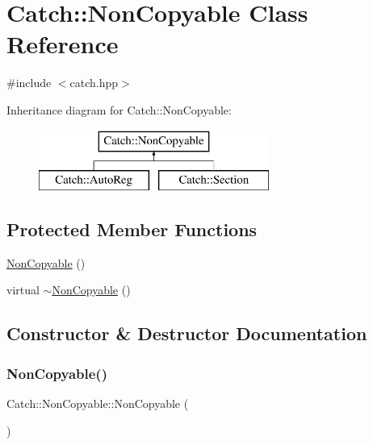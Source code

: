 \hypertarget{class_catch_1_1_non_copyable}{}\section{Catch\+:\+:Non\+Copyable Class Reference}
\label{class_catch_1_1_non_copyable}


{\ttfamily \#include $<$catch.\+hpp$>$}

Inheritance diagram for Catch\+:\+:Non\+Copyable\+:\begin{figure}[H]
\begin{center}
\leavevmode
\includegraphics[height=2.000000cm]{class_catch_1_1_non_copyable}
\end{center}
\end{figure}
\subsection*{Protected Member Functions}
\begin{DoxyCompactItemize}
\item 
\mbox{\hyperlink{class_catch_1_1_non_copyable_a4b492dd5753f9952350fb64dc6cb9fe2}{Non\+Copyable}} ()
\item 
virtual \mbox{\hyperlink{class_catch_1_1_non_copyable_a81254677280fef337eb4a676e91e3293}{$\sim$\+Non\+Copyable}} ()
\end{DoxyCompactItemize}


\subsection{Constructor \& Destructor Documentation}
\mbox{\label{class_catch_1_1_non_copyable_a4b492dd5753f9952350fb64dc6cb9fe2}} 
\subsubsection{\texorpdfstring{Non\+Copyable()}{NonCopyable()}}
{\footnotesize\ttfamily Catch\+::\+Non\+Copyable\+::\+Non\+Copyable (\begin{DoxyParamCaption}{ }\end{DoxyParamCaption})\hspace{0.3cm}{\ttfamily [protected]}}

